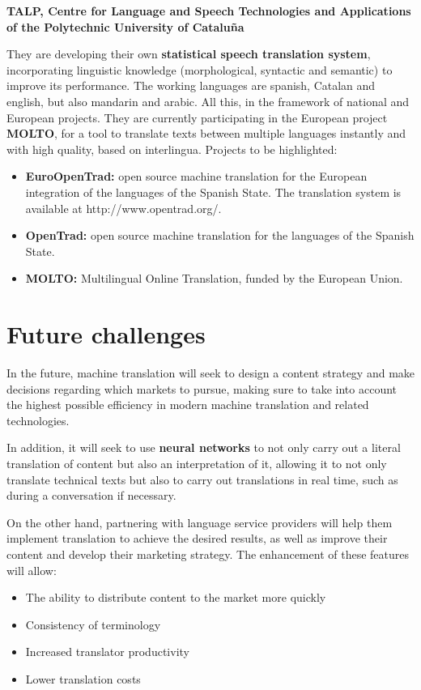 \documentclass[a4paper]{article}
\theoremstyle{plain}
\theoremstyle{definition}
\begin{document}
   \begin{flushleft}
    \textbf{TALP, Centre for Language and Speech Technologies and Applications of the Polytechnic University of Cataluña}
   \end{flushleft}
    They are developing their own \textbf{statistical speech translation system}, incorporating linguistic knowledge (morphological, syntactic and semantic) to improve its performance. The working languages are spanish, Catalan and english, but also mandarin and arabic. All this, in the framework of national and European projects. They are currently participating in the European project \textbf{MOLTO}, for a tool to translate texts between multiple languages instantly and with high quality, based on interlingua. Projects to be highlighted:
    \begin{itemize}
        \item \textbf{EuroOpenTrad: }open source machine translation for the European integration of the languages of the Spanish State. The translation system is available at http://www.opentrad.org/.
        \item\textbf{OpenTrad: }open source machine translation for the languages of the Spanish State.
        \item \textbf{MOLTO: }Multilingual Online Translation, funded by the European Union.
    \end{itemize}

	\label{sec:examples}
	\section{Future challenges}
	\label{sec:examples}

	In the future, machine translation will seek to design a content strategy and make decisions regarding which markets to pursue, making sure to take into account the highest possible efficiency in modern machine translation and related technologies.\newline

    In addition, it will seek to use \textbf{neural networks} to not only carry out a literal translation of content but also an interpretation of it, allowing it to not only translate technical texts but also to carry out translations in real time, such as during a conversation if necessary.\newline

    On the other hand, partnering with language service providers will help them implement translation to achieve the desired results, as well as improve their content and develop their marketing strategy. The enhancement of these features will allow:
    \begin{itemize}
        \item The ability to distribute content to the market more quickly
        \item Consistency of terminology
        \item Increased translator productivity
        \item Lower translation costs
    \end{itemize}
   
\end{document}
